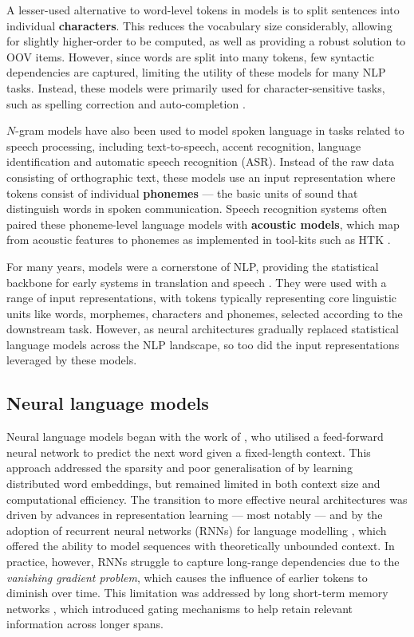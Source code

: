 A lesser-used alternative to word-level tokens in \ngram models is to split sentences into individual \textbf{characters}. This reduces the vocabulary size considerably, allowing for slightly higher-order \ngrams to be computed, as well as providing a robust solution to OOV items. However, since words are split into many tokens, few syntactic dependencies are captured, limiting the utility of these models for many NLP tasks. Instead, these models were primarily used for character-sensitive tasks, such as spelling correction and auto-completion \citep{cucerzan_spelling_2004}.

$N$-gram models have also been used to model spoken language in tasks related to speech processing, including text-to-speech, accent recognition, language identification and automatic speech recognition (ASR). Instead of the raw data consisting of orthographic text, these models use an input representation where tokens consist of individual \textbf{phonemes} --- the basic units of sound that distinguish words in spoken communication. Speech recognition systems often paired these phoneme-level language models with \textbf{acoustic models}, which map from acoustic features to phonemes as implemented in tool-kits such as HTK \citep{young2006htk}.

For many years, \ngram models were a cornerstone of NLP, providing the statistical backbone for early systems in translation and speech \citep{jurafsky2009speech}. They were used with a range of input representations, with tokens typically representing core linguistic units like words, morphemes, characters and phonemes, selected according to the downstream task. However, as neural architectures gradually replaced statistical language models across the NLP landscape, so too did the input representations leveraged by these models.

\subsection{Neural language models}

Neural language models began with the work of \citet{bengio2003neural}, who utilised a feed-forward neural network to predict the next word given a fixed-length context. This approach addressed the sparsity and poor generalisation of \ngrams by learning distributed word embeddings, but remained limited in both context size and computational efficiency. The transition to more effective neural architectures was driven by advances in representation learning --- most notably  \citep{mikolov_distributed_2013} --- and by the adoption of recurrent neural networks (RNNs) for language modelling \citep[RNNLMs;][]{mikolov2010recurrent}, which offered the ability to model sequences with theoretically unbounded context. In practice, however, RNNs struggle to capture long-range dependencies due to the \emph{vanishing gradient problem}, which causes the influence of earlier tokens to diminish over time. This limitation was addressed by long short-term memory networks \citep[LSTMs;][]{sundermeyer2012lstm}, which introduced gating mechanisms to help retain relevant information across longer spans. 

